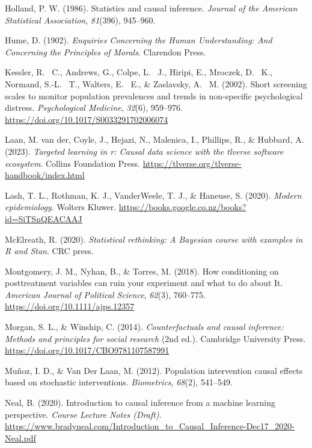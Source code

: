 \documentclass[
  single column]{article}
\newlength{\cslhangindent}
\newenvironment{CSLReferences}[2] %
 {\begin{list}{}{%
  \setlength{\itemindent}{0pt}
  \setlength{\leftmargin}{0pt}
  \setlength{\parsep}{0pt}
  \ifodd #1
   \setlength{\leftmargin}{\cslhangindent}
   \setlength{\itemindent}{-1\cslhangindent}
  \fi
  \setlength{\itemsep}{#2\baselineskip}}}
 {\end{list}}
\begin{document}
\begin{CSLReferences}{1}{0}
Holland, P. W. (1986). Statistics and causal inference. \emph{Journal of
the American Statistical Association}, \emph{81}(396), 945--960.

Hume, D. (1902). \emph{Enquiries Concerning the Human Understanding: And
Concerning the Principles of Morals}. Clarendon Press.

Kessler, R. ~C., Andrews, G., Colpe, L. ~J., Hiripi, E., Mroczek, D.
~K., Normand, S.-L. ~T., Walters, E. ~E., \& Zaslavsky, A. ~M. (2002).
Short screening scales to monitor population prevalences and trends in
non-specific psychological distress. \emph{Psychological Medicine},
\emph{32}(6), 959--976. \url{https://doi.org/10.1017/S0033291702006074}

Laan, M. van der, Coyle, J., Hejazi, N., Malenica, I., Phillips, R., \&
Hubbard, A. (2023). \emph{Targeted learning in r: Causal data science
with the tlverse software ecosystem}. Collins Foundation Press.
\url{https://tlverse.org/tlverse-handbook/index.html}

Lash, T. L., Rothman, K. J., VanderWeele, T. J., \& Haneuse, S. (2020).
\emph{Modern epidemiology}. Wolters Kluwer.
\url{https://books.google.co.nz/books?id=SiTSnQEACAAJ}

McElreath, R. (2020). \emph{Statistical rethinking: A {B}ayesian course
with examples in {R} and {S}tan}. CRC press.

Montgomery, J. M., Nyhan, B., \& Torres, M. (2018). How conditioning on
posttreatment variables can ruin your experiment and what to do about
It. \emph{American Journal of Political Science}, \emph{62}(3),
760--775. \url{https://doi.org/10.1111/ajps.12357}

Morgan, S. L., \& Winship, C. (2014). \emph{Counterfactuals and causal
inference: Methods and principles for social research} (2nd ed.).
Cambridge University Press.
\url{https://doi.org/10.1017/CBO9781107587991}

Muñoz, I. D., \& Van Der Laan, M. (2012). Population intervention causal
effects based on stochastic interventions. \emph{Biometrics},
\emph{68}(2), 541--549.

Neal, B. (2020). Introduction to causal inference from a machine
learning perspective. \emph{Course Lecture Notes (Draft)}.
\url{https://www.bradyneal.com/Introduction_to_Causal_Inference-Dec17_2020-Neal.pdf}


\end{CSLReferences}
\end{document}
